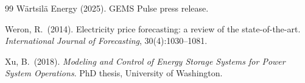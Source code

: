 \documentclass[11pt]{article}
\begin{document}
\begin{thebibliography}{99}
W\"{a}rtsil\"{a} Energy (2025). GEMS Pulse press release.

Weron, R.\ (2014). Electricity price forecasting: a review of the state-of-the-art. \emph{International Journal of Forecasting}, 30(4):1030--1081.

Xu, B.\ (2018). \emph{Modeling and Control of Energy Storage Systems for Power System Operations}. PhD thesis, University of Washington.

\end{thebibliography}
\end{document}
